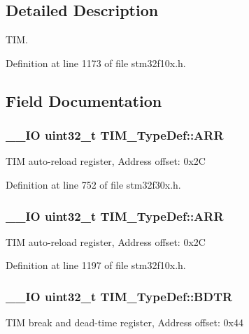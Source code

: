 \subsection{Detailed Description}
T\-I\-M. 

Definition at line 1173 of file stm32f10x.\-h.



\subsection{Field Documentation}
\hypertarget{struct_t_i_m___type_def_a6a42766a6ca3c7fe10a810ebd6b9d627}{
\subsubsection[{A\-R\-R}]{\setlength{\rightskip}{0pt plus 5cm}\-\_\-\-\_\-\-I\-O {\bf uint32\-\_\-t} T\-I\-M\-\_\-\-Type\-Def\-::\-A\-R\-R}}\label{struct_t_i_m___type_def_a6a42766a6ca3c7fe10a810ebd6b9d627}
T\-I\-M auto-\/reload register, Address offset\-: 0x2\-C 

Definition at line 752 of file stm32f30x.\-h.

\hypertarget{struct_t_i_m___type_def_a6a42766a6ca3c7fe10a810ebd6b9d627}{
\subsubsection[{A\-R\-R}]{\setlength{\rightskip}{0pt plus 5cm}\-\_\-\-\_\-\-I\-O {\bf uint32\-\_\-t} T\-I\-M\-\_\-\-Type\-Def\-::\-A\-R\-R}}\label{struct_t_i_m___type_def_a6a42766a6ca3c7fe10a810ebd6b9d627}
T\-I\-M auto-\/reload register, Address offset\-: 0x2\-C 

Definition at line 1197 of file stm32f10x.\-h.

\hypertarget{struct_t_i_m___type_def_a137d3523b60951eca1e4130257b2b23d}{
\subsubsection[{B\-D\-T\-R}]{\setlength{\rightskip}{0pt plus 5cm}\-\_\-\-\_\-\-I\-O {\bf uint32\-\_\-t} T\-I\-M\-\_\-\-Type\-Def\-::\-B\-D\-T\-R}}\label{struct_t_i_m___type_def_a137d3523b60951eca1e4130257b2b23d}
T\-I\-M break and dead-\/time register, Address offset\-: 0x44 

